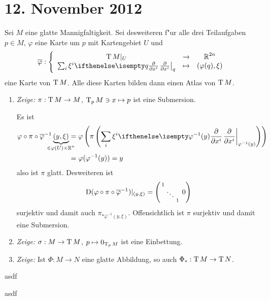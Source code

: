 \section{12. November 2012}
\setcounter{Aufg}{0} %
\setcounter{Loes}{0}

\begin{Loes}
Sei $M$ eine glatte Mannigfaltigkeit. Sei desweiteren f"ur alle drei Teilaufgaben $p \in M$, $\varphi$ eine Karte um $p$ mit Kartengebiet $U$ und
	\[ \overline \varphi: \left\{ \begin{array}{ccc}  \T M|_U &\to& \R^{2n} \\
		\sum_i \xi^i\pdifffrac[q]{}{x^i} &\mapsto& (\varphi(q), \xi) \end{array} \right.\]
eine Karte von $\operatorname{T} M$. Alle diese Karten bilden dann einen Atlas von $\operatorname{T} M$.
\begin{enumerate}[label=\alph*),widest=a,leftmargin=*]
\item
	\emph{Zeige:} $\pi: \operatorname{T} M \to M$, $\operatorname{T}_p M \ni x \mapsto p$ ist eine Submersion.
	
	Es ist
	\begin{align*} \varphi \circ \pi \circ \overline \varphi^{-1} \underbrace{(y, \xi)}_{\mathclap{\in \varphi(U) \X \R^n}} &= \varphi\left(\pi\left(\sum_i \xi^i \pdifffrac[\varphi^{-1}(y)]{}{x^i}\right)\right)\\
		&= \varphi(\varphi^{-1}(y)) = y
	\end{align*}
	also ist $\pi$ glatt. Desweiteren ist
		\[ \operatorname{D}(\varphi \circ \pi \circ \overline \varphi^{-1})|_{(y, \xi)} = \left(\begin{smallmatrix}
        1 &  & \\
        & \ddots & & \\
         & & 1
      \end{smallmatrix} 0\right) \]
     surjektiv und damit auch $\pi_{*\overline\varphi^{-1}(y, \xi)}$. Offensichtlich ist $\pi$ surjektiv und damit eine Submersion.
\item
	\emph{Zeige:} $\sigma: M \to \operatorname{T} M$, $p \mapsto 0_{\operatorname{T}_pM}$ ist eine Einbettung.
\item
	\emph{Zeige:} Ist $\Phi: M \to N$ eine glatte Abbildung, so auch $\Phi_*: \operatorname{T} M \to \operatorname{T} N$.
\end{enumerate}\end{Loes}

\begin{Loes}
asdf
\end{Loes}

\begin{Loes}
asdf
\end{Loes}